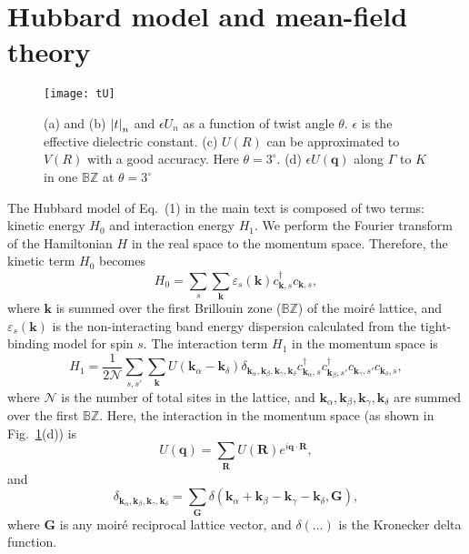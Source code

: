 \documentclass[aps,prl,floatfix,twocolumn]{revtex4-1}
\begin{document}
\section{Hubbard model and mean-field theory}

\begin{figure}[t]
	\centering
	\texttt{[image: tU]}
	\caption{(a) and (b) $ \abs{t}_n $ and $\epsilon U_n $ as a function of twist angle $ \theta $. $ \epsilon $ is the effective dielectric constant. (c) $ U(R) $ can be approximated to $ V(R) $ with a good accuracy. Here $ \theta=3^\circ. $ (d) $ \epsilon U(\bm{q}) $ along $ \Gamma $ to $ K $ in one $ \mathbb{BZ} $ at  $ \theta=3^\circ$}
	\label{fig:tU}
\end{figure}



The Hubbard model of Eq.~(1) in the main text is composed of two terms: kinetic energy $ H_0 $ and interaction energy $ H_1 $. We perform the Fourier transform of the Hamiltonian $ H $ in the real space to the momentum space. Therefore, the kinetic term $ H_0 $ becomes
\begin{equation}\label{eq:H0}
	H_0=\sum_{s}\sum_{{\bm{k}}}^{}\varepsilon_s(\bm{k}) c_{\bm{k},s}^\dagger c_{\bm{k},s},
\end{equation}
where $ \bm{k} $ is summed over the first Brillouin zone ($\mathbb{BZ}$) of the moir\'e lattice, and $ \varepsilon_s(\bm{k}) $ is the non-interacting band energy dispersion calculated from the tight-binding model for spin $ s $. The interaction term $ H_1 $ in the momentum space is 
\begin{equation}\label{eq:H1}
	H_1=\frac{1}{2\mathcal{N}}\sum_{s,s'} \sum_{\bm{k}} U(\bm{k}_\alpha-\bm{k}_\delta)\delta_{\bm{k}_\alpha,\bm{k}_\beta,\bm{k}_\gamma,\bm{k}_\delta} c_{\bm{k}_\alpha,s}^\dagger c_{\bm{k}_\beta,s'}^\dagger c_{\bm{k}_\gamma,s'} c_{\bm{k}_\delta,s},
\end{equation}
where $ \mathcal{N} $ is the number of total sites in the lattice, and  $ \bm{k}_\alpha,\bm{k}_\beta,\bm{k}_\gamma , \bm{k}_\delta $ are summed over the first $ \mathbb{BZ} $. Here, the interaction in the momentum space (as shown in Fig.~\ref{fig:tU}(d)) is
\begin{equation}
	U(\bm{q})=\sum_{\bm{R}}U(\bm{R})e^{i\bm{q}\cdot\bm{R}},
\end{equation}
and
\begin{equation}
	\delta_{\bm{k}_\alpha,\bm{k}_\beta,\bm{k}_\gamma,\bm{k}_\delta}=\sum_{\bm{G}}\delta(\bm{k}_\alpha+\bm{k}_\beta-\bm{k}_\gamma-\bm{k}_\delta,\bm{G}),
\end{equation}
where  $ \bm{G} $ is any moir\'e reciprocal lattice vector, and $ \delta(\dots) $ is the Kronecker delta function.
\end{document}
